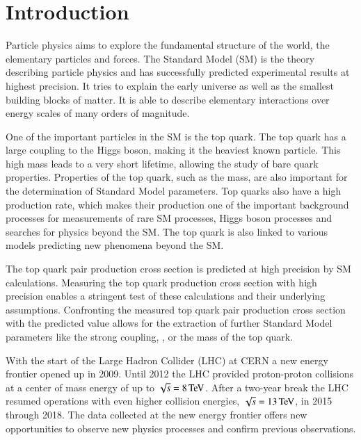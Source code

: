 
\chapter{Introduction}

Particle physics aims to explore the fundamental structure of the world, the elementary particles and forces.
The Standard Model (SM) is the theory describing particle physics and has successfully predicted experimental results at highest precision. 
It tries to explain the early universe as well as the smallest building blocks of matter. It is able to describe elementary interactions over energy scales of many orders of magnitude. 

One of the important particles in the SM is the top quark. The top quark has a large coupling to the Higgs boson, making it the heaviest known particle.
This high mass leads to a very short lifetime, allowing the study of bare quark properties.
Properties of the top quark, such as the mass, are also important for the determination of Standard Model parameters. Top quarks also have a high production rate, which makes their production
one of the important background processes for measurements of rare SM processes, Higgs boson processes and searches for physics beyond the SM. The top quark is also linked to various models predicting new phenomena beyond the SM.

The top quark pair production cross section is predicted at high precision by SM calculations. Measuring the top quark production cross section with high precision enables a stringent test of these calculations and their underlying assumptions. Confronting the measured top quark pair production cross section with the predicted value allows for the extraction of further Standard Model parameters like the strong coupling, \as, or the mass of the top quark.

With the start of the Large Hadron Collider (LHC) at CERN a new energy frontier opened up in 2009. Until 2012 the LHC provided proton-proton collisions at a center of mass energy of up to $\sqrt{s}=8 \,\text{Te\hspace{-.08em}V}$.  After a two-year break the LHC resumed operations with even higher collision energies, $\sqrt{s}=13 \,\text{Te\hspace{-.08em}V}$, in 2015 through 2018.
The data collected at the new energy frontier offers new opportunities to observe new physics processes and
confirm previous observations.

